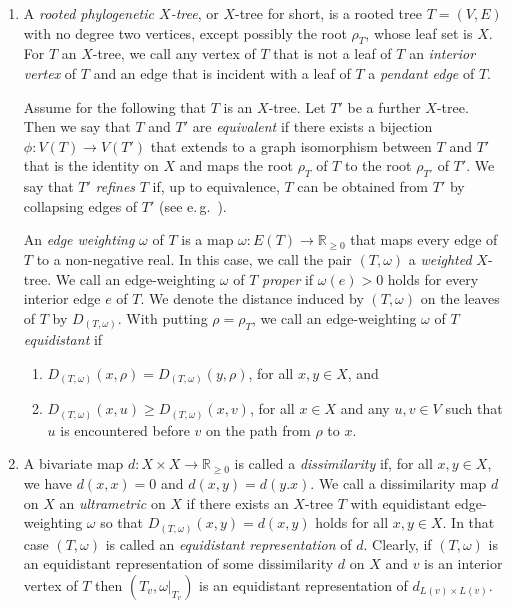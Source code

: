 \begin{enumerate}
\item A {\em rooted phylogenetic $X$-tree}, or $X$-tree for short, is a rooted
  tree $T=(V,E)$ with no degree two vertices, except possibly the root
  $\rho_T$, whose leaf set is $X$. For $T$ an $X$-tree, we call any vertex of
  $T$ that is not a leaf of $T$ an {\em interior vertex} of $T$ and an edge
  that is incident with a leaf of $T$ a {\em pendant edge} of $T$.

  Assume for the following that $T$ is an $X$-tree. Let $T'$ be a further
  $X$-tree. Then we say that $T$ and $T'$ are {\em equivalent} if there exists
  a bijection $\phi:V(T)\to V(T')$ that extends to a graph isomorphism between
  $T$ and $T'$ that is the identity on $X$ and maps the root $\rho_T$ of $T$
  to the root $\rho_{T'}$ of $T'$. We say that $T'$ {\em refines} $T$ if, up
  to equivalence, $T$ can be obtained from $T'$ by collapsing edges of $T'$
  (see e.\,g.\, \cite{semple2003phylogenetics}).

  An {\em edge weighting} $\omega$ of $T$ is a map $\omega :E(T)\to \mathbb
  R_{\geq 0}$ that maps every edge of $T$ to a non-negative real. In this case,
  we call the pair $(T,\omega)$ a {\em weighted} $X$-tree. We call an
  edge-weighting $\omega$ of $T$ {\em proper} if $\omega(e)>0$ holds for every
  interior edge $e$ of $T$. We denote the distance induced by $(T,\omega)$ on
  the leaves of $T$ by $D_{(T,\omega)}$.  With putting $\rho=\rho_T$, we call an
  edge-weighting $\omega$ of $T$ {\em equidistant} if
  \begin{enumerate}
  \item $D_{(T,\omega)}(x,\rho)= D_{(T,\omega)}(y,\rho)$, for all $x,y\in X$,
    and
  \item $D_{(T,\omega)}(x,u)\geq D_{(T,\omega)}(x,v)$, for all $x\in X$ and
    any $u,v\in V$ such that $u$ is encountered before $v$ on the path from
    $\rho$ to $x$.
  \end{enumerate}
\item A bivariate map $d:X\times X\to \mathbb R_{\geq 0}$ is called a {\em
    dissimilarity} if, for all $x,y\in X$, we have $d(x,x)=0$ and
  $d(x,y)=d(y.x)$. We call a dissimilarity map $d$ on $X$ an {\em ultrametric}
  on $X$ if there exists an $X$-tree $T$ with equidistant edge-weighting
  $\omega$ so that $D_{(T,\omega)}(x,y)=d(x,y)$ holds for all $x,y\in X$. In
  that case $(T,\omega)$ is called an {\em equidistant representation} of $d$.
  Clearly, if $(T,\omega)$ is an equidistant representation of some
  dissimilarity $d$ on $X$ and $v$ is an interior vertex of $T$ then $(T_v,
  \omega|_{T_v})$ is an equidistant representation of $d_{L(v)\times L(v)}$.


\end{enumerate}
